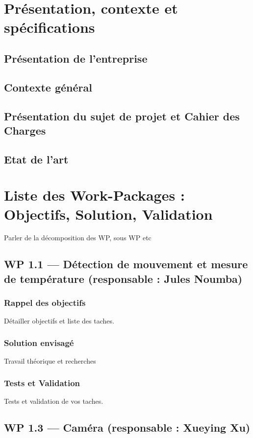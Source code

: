 ﻿\documentclass[11pt]{article}
\begin{document}
\section{Présentation, contexte et spécifications}
\subsection{Présentation de l’entreprise}
\subsection{Contexte général}
\subsection{Présentation du sujet de projet et Cahier des Charges}
\subsection{Etat de l'art}



\section{Liste des Work-Packages : Objectifs, Solution, Validation}

Parler de la décomposition des WP, sous WP etc

\subsection{WP 1.1 — Détection de mouvement et mesure de température (responsable : Jules Noumba)}
\subsubsection{Rappel des objectifs}
Détailler objectifs et liste des taches.
\subsubsection{Solution envisagé}
Travail théorique et recherches
\subsubsection{Tests et Validation}
Tests et validation de vos taches.



\subsection{WP 1.3 — Caméra (responsable : Xueying Xu)}
\end{document}
